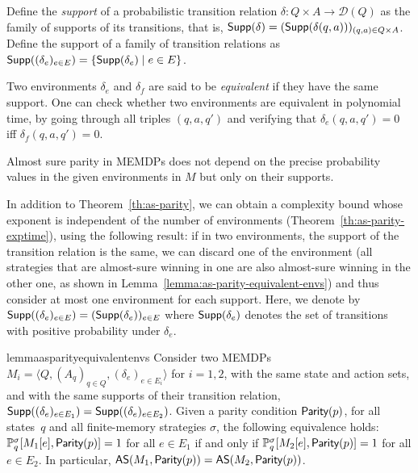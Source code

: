 \documentclass[a4paper,USenglish,cleveref, autoref, thm-restate]{lipics-v2021}
\newcommand{\tuple}[1]{\langle #1 \rangle}
\newcommand*{\pr}{\mathbb{P}}
\newcommand\Supp{\textrm{\sf Supp}}
\newcommand\almostsure{\textrm{\sf AS}}
\newcommand\Parity{\textrm{\sf Parity}}
\newcommand\D{\mathcal{D}}
\newcommand\straa{\sigma}
\begin{document}
Define the \emph{support} of a probabilistic transition relation $\delta : Q\times A \rightarrow \D(Q)$
as the family of supports of its transitions, that is, $\Supp(\delta) = (\Supp(\delta(q,a)))_{(q,a) \in Q\times A}$.
Define the support of a family of transition relations
as $\Supp((\delta_e)_{e \in E}) = \{ \Supp(\delta_e) \mid e  \in E\}$.

Two environments $\delta_e$ and $\delta_f$ are said to be \emph{equivalent} if they have the same support.
One can check whether two environments are equivalent in polynomial time,
by going through all triples $(q,a,q')$ and verifying that $\delta_e(q,a,q')= 0$
iff $\delta_f(q,a,q')=0$.

Almost sure parity in MEMDPs does not depend on the precise probability values in the given environments in $M$ but only on their supports.


In addition to Theorem~\ref{th:as-parity}, we can obtain a complexity bound whose exponent
is independent of the number of environments (Theorem~\ref{th:as-parity-exptime}),
using the following result: if in two
environments, the support of the transition relation is the same, 
we can discard one of the environment (all strategies that are almost-sure winning
in one are also almost-sure winning in the other one, as shown in Lemma~\ref{lemma:as-parity-equivalent-envs}) 
and thus consider at most one environment for each support.
Here, we denote by $\Supp((\delta_e)_{e \in E}) = (\Supp(\delta_e))_{e \in E}$ where $\Supp(\delta_e)$ denotes the set of transitions with positive probability under $\delta_e$.

\begin{restatable}{lemma}{asparityequivalentenvs}
	\label{lemma:as-parity-equivalent-envs}
	Consider two MEMDPs $M_i = \tuple{Q, (A_q)_{q \in Q}, (\delta_e)_{e \in E_i}}$ for $i=1,2$,	
	with the same state and action sets, and with the same supports of their
	transition relation, $\Supp((\delta_e)_{e \in E_1}) = \Supp((\delta_e)_{e \in E_2})$. 
	Given a parity condition $\Parity(p)$, for all states~$q$ and all finite-memory strategies $\straa$, 
	the following equivalence holds:
	$\pr_{q}^{\straa}[M_1[e], \Parity(p)] = 1$ for all $e\in E_1$ if and only if 
	$\pr_{q}^{\straa}[M_2[e], \Parity(p)] = 1$ for all $e\in E_2$.
	In particular, $\almostsure(M_1, \Parity(p)) = \almostsure(M_2, \Parity(p))$. 
\end{restatable}
\end{document}
